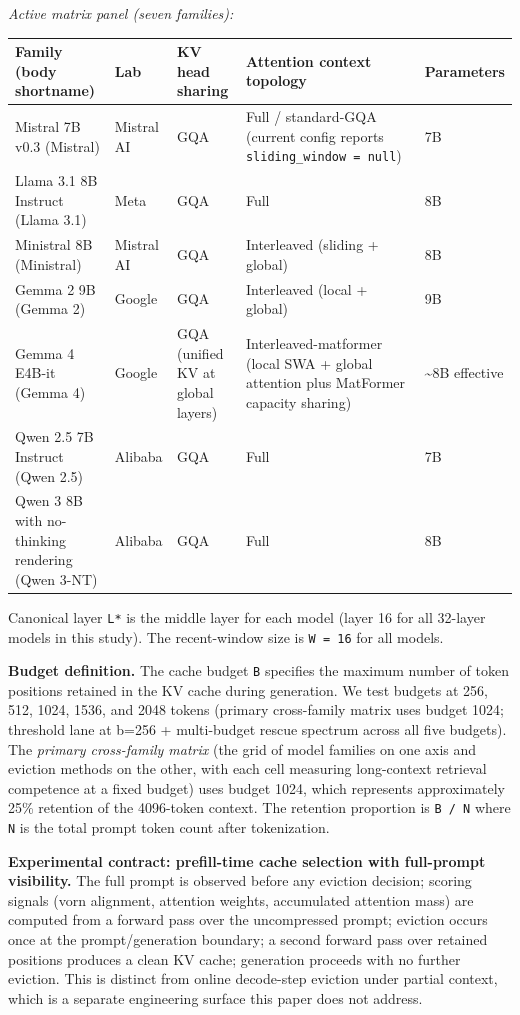 \documentclass[10pt]{article}
\newcounter{none} %
\begin{document}
\emph{Active matrix panel (seven families):}

{\def\LTcaptype{none} %
{\scriptsize\setlength{\tabcolsep}{2pt}\renewcommand{\arraystretch}{0.92} \begin{longtable}[]{@{}p{2.8cm}lp{2.4cm}p{3.5cm}l@{}}
\toprule\noalign{}
Family (body shortname) & Lab & KV head sharing & Attention context
topology & Parameters \\
\midrule\noalign{}
\endhead
\bottomrule\noalign{}
\endlastfoot
Mistral 7B v0.3 (Mistral) & Mistral AI & GQA & Full / standard-GQA
(current config reports \texttt{sliding\_window\ =\ null}) & 7B \\
Llama 3.1 8B Instruct (Llama 3.1) & Meta & GQA & Full & 8B \\
Ministral 8B (Ministral) & Mistral AI & GQA & Interleaved (sliding +
global) & 8B \\
Gemma 2 9B (Gemma 2) & Google & GQA & Interleaved (local + global) &
9B \\
Gemma 4 E4B-it (Gemma 4) & Google & GQA (unified KV at global layers)
& Interleaved-matformer (local SWA + global attention plus MatFormer
capacity sharing) & \textasciitilde8B effective \\
Qwen 2.5 7B Instruct (Qwen 2.5) & Alibaba & GQA & Full & 7B \\
Qwen 3 8B with no-thinking rendering (Qwen 3-NT) & Alibaba & GQA &
Full & 8B \\
\end{longtable}}
}

Canonical layer \texttt{L*} is the middle layer for each model (layer 16
for all 32-layer models in this study). The recent-window size is
\texttt{W\ =\ 16} for all models.

\textbf{Budget definition.} The cache budget \texttt{B} specifies the
maximum number of token positions retained in the KV cache during
generation. We test budgets at 256, 512, 1024, 1536, and 2048 tokens
(primary cross-family matrix uses budget 1024; threshold lane at
b=256 + multi-budget rescue spectrum across all five budgets). The
\emph{primary cross-family matrix} (the grid of model families on one
axis and eviction methods on the other, with each cell measuring
long-context retrieval competence at a fixed budget) uses budget 1024,
which represents approximately 25\% retention of the 4096-token context.
The retention proportion is \texttt{B\ /\ N} where \texttt{N} is the
total prompt token count after tokenization.

\textbf{Experimental contract: prefill-time cache selection with
full-prompt visibility.} The full prompt is observed before any eviction
decision; scoring signals (vorn alignment, attention weights,
accumulated attention mass) are computed from a forward pass over the
uncompressed prompt; eviction occurs once at the prompt/generation
boundary; a second forward pass over retained positions produces a
clean KV cache; generation proceeds with no further eviction. This is
distinct from online decode-step eviction under partial context, which
is a separate engineering surface this paper does not address.
\end{document}
